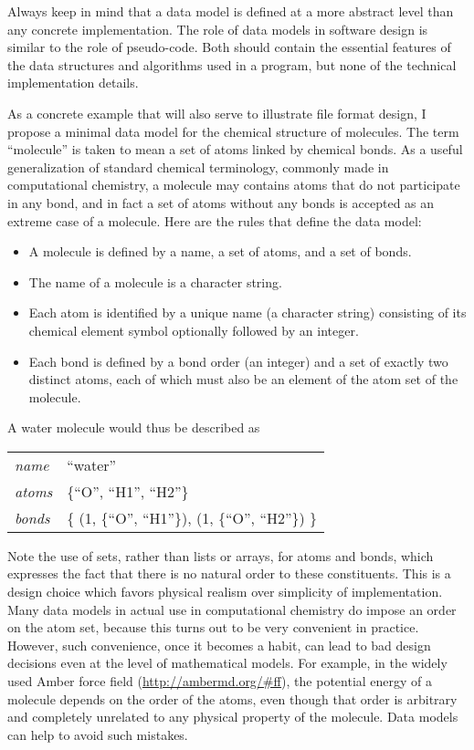 \documentclass{csmagazine}
\begin{document}
Always keep in mind that a data model is defined at a more abstract level than any concrete implementation. The role of data models in software design is similar to the role of pseudo-code. Both should contain the essential features of the data structures and algorithms used in a program, but none of the technical implementation details.

As a concrete example that will also serve to illustrate file format design, I propose a minimal data model for the chemical structure of molecules. The term ``molecule'' is taken to mean a set of atoms linked by chemical bonds. As a useful generalization of standard chemical terminology, commonly made in computational chemistry, a molecule may contains atoms that do not participate in any bond, and in fact a set of atoms without any bonds is accepted as an extreme case of a molecule. Here are the rules that define the data model:
\begin{itemize}
\item A molecule is defined by a name, a set of atoms, and a set of bonds.
\item The name of a molecule is a character string.
\item Each atom is identified by a unique name (a character string) consisting of its chemical element symbol optionally followed by an integer.
\item Each bond is defined by a bond order (an integer) and a set of exactly two distinct atoms, each of which must also be an element of the atom set of the molecule.
\end{itemize}

A water molecule would thus be described as

\begin{tabular}[t]{ll}
\textit{name}  & ``water''\\
\textit{atoms} &  \{``O'', ``H1'', ``H2''\}\\
\textit{bonds} & \{ (1, \{``O'', ``H1''\}), (1, \{``O'', ``H2''\}) \}
\end{tabular}

\vspace{3mm}

Note the use of sets, rather than lists or arrays, for atoms and bonds, which expresses the fact that there is no natural order to these constituents. This is a design choice which favors physical realism over simplicity of implementation. Many data models in actual use in computational chemistry do impose an order on the atom set, because this turns out to be very convenient in practice. However, such convenience, once it becomes a habit, can lead to bad design decisions even at the level of mathematical models. For example, in the widely used Amber force field (\url{http://ambermd.org/\#ff}), the potential energy of a molecule depends on the order of the atoms, even though that order is arbitrary and completely unrelated to any physical property of the molecule. Data models can help to avoid such mistakes.
\end{document}
